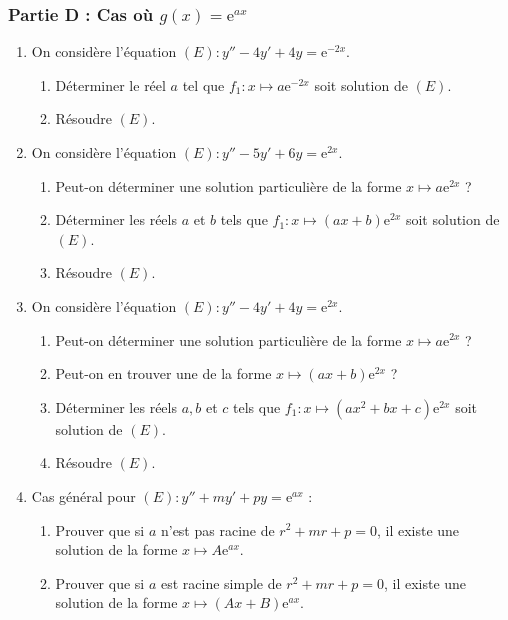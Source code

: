 \documentclass[12pt,a4paper]{article}
\begin{document}
\subsubsection*{Partie D : Cas où $g(x) = \mathrm{e}^{ax}$}
\begin{enumerate}
    \item On considère l'équation $(E) : y'' - 4y' + 4y = \mathrm{e}^{-2x}.$
    \begin{enumerate}[label=\alph*)]
        \item Déterminer le réel $a$ tel que $f_{1} : x \mapsto a\mathrm{e}^{-2x}$ soit solution de $(E)$.
        \item Résoudre $(E)$.
    \end{enumerate}
    \item On considère l'équation $(E) : y'' - 5y' + 6y = \mathrm{e}^{2x}.$
    \begin{enumerate}[label=\alph*)]
        \item Peut-on déterminer une solution particulière de la forme $x \mapsto a\mathrm{e}^{2x}$ ?
        \item Déterminer les réels $a$ et $b$ tels que $f_{1} : x \mapsto (ax + b)\mathrm{e}^{2x}$ soit solution de $(E)$.
        \item Résoudre $(E)$.
    \end{enumerate}
    \item On considère l'équation $(E) : y'' - 4y' + 4y = \mathrm{e}^{2x}.$
    \begin{enumerate}[label=\alph*)]
        \item Peut-on déterminer une solution particulière de la forme $x \mapsto a\mathrm{e}^{2x}$ ?
        \item Peut-on en trouver une de la forme $x \mapsto (ax + b)\mathrm{e}^{2x}$ ?
        \item Déterminer les réels $a, b$ et $c$ tels que $f_{1} : x \mapsto (ax^{2} + bx + c)\mathrm{e}^{2x}$ soit solution de $(E)$.
        \item Résoudre $(E)$.
    \end{enumerate}
    \item Cas général pour $(E) : y'' + my' + py = \mathrm{e}^{ax}$ :
    \begin{enumerate}[label=\alph*)]
        \item Prouver que si $a$ n'est pas racine de $r^{2} + mr + p = 0$, il existe une solution de la forme $x \mapsto A\mathrm{e}^{ax}$.
        \item Prouver que si $a$ est racine simple de $r^{2} + mr + p = 0$, il existe une solution de la forme $x \mapsto (Ax + B)\mathrm{e}^{ax}$.

\end{enumerate}
\end{enumerate}
\end{document}
